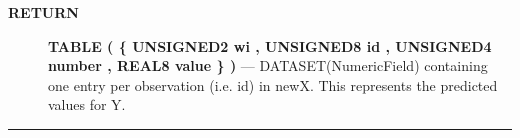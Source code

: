 \par
\begin{description}
\item [\colorbox{tagtype}{\color{white} \textbf{\textsf{RETURN}}}] \textbf{TABLE ( \{ UNSIGNED2 wi , UNSIGNED8 id , UNSIGNED4 number , REAL8 value \} )} --- DATASET(NumericField) containing one entry per observation (i.e. id) in newX. This represents the predicted values for Y.
\end{description}




\rule{\linewidth}{0.5pt}


